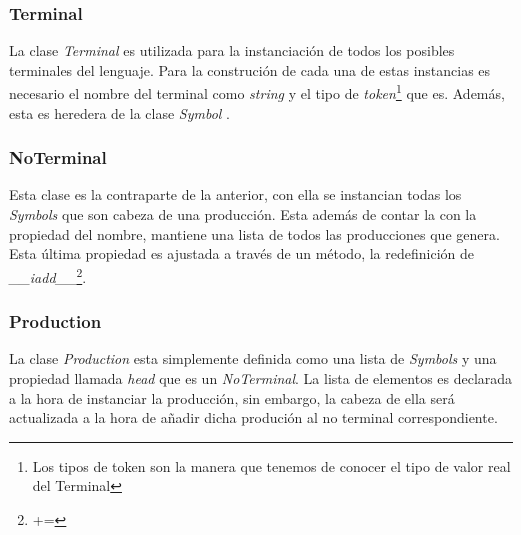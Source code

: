 \documentclass[10pt,a4paper]{article}
\begin{document}




\subsubsection{Terminal}
La clase \textit{Terminal} es utilizada para la instanciación de todos los posibles terminales del lenguaje. Para la construción de cada una de estas instancias es necesario el nombre del terminal como \textit{string} y el tipo de \textit{token}\footnote{Los tipos de token son la manera que tenemos de conocer el tipo de valor real del Terminal} que es. Además, esta es heredera de la clase \textit{Symbol} .





\subsubsection{NoTerminal}
Esta clase es la contraparte de la anterior, con ella se instancian todas los \textit{Symbols} que son cabeza de una producción. Esta además de contar la con la propiedad del nombre, mantiene una lista de todos las producciones que genera. Esta última propiedad es ajustada a través de un método, la redefinición de \textit{\_\_iadd\_\_}\footnote{ += }.





\subsubsection{Production}
La clase \textit{Production} esta simplemente definida como una lista de \textit{Symbols} y una propiedad llamada \textit{head} que es un \textit{NoTerminal}. La lista de elementos es declarada a la hora de instanciar la producción, sin embargo, la cabeza de ella será actualizada a la hora de añadir dicha produción al no terminal correspondiente.
  
  

  
    
\end{document}
